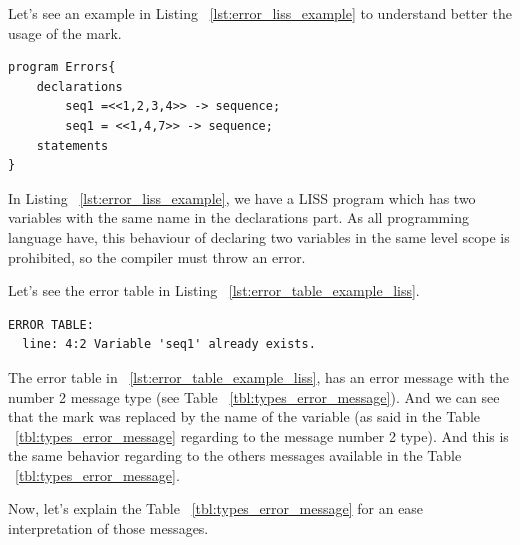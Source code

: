 \documentclass[
  oneside,
  11pt, a4paper,
  footinclude=true,
  headinclude=true,
  cleardoublepage=empty
]{scrbook}
\begin{document}
Let's see an example in Listing ~\ref{lst:error_liss_example} to understand better the usage of the mark.
\begin{lstlisting}[label={lst:error_liss_example},caption={Partial Listing}]
program Errors{
	declarations
		seq1 =<<1,2,3,4>> -> sequence;
		seq1 = <<1,4,7>> -> sequence;
	statements
}
\end{lstlisting}

In Listing ~\ref{lst:error_liss_example}, we have a LISS program which has two variables with the same name in the declarations part. As all programming language have, this behaviour of declaring two variables in the same level scope is prohibited, so the compiler must throw an error.

Let's see the error table in Listing ~\ref{lst:error_table_example_liss}.

\begin{lstlisting}[label={lst:error_table_example_liss},caption={Error table related to Listing ~\ref{lst:error_liss_example}}]
  ERROR TABLE:
  line: 4:2	Variable 'seq1' already exists.
\end{lstlisting}

The error table in ~\ref{lst:error_table_example_liss}, has an error message with the number 2 message type (see Table ~\ref{tbl:types_error_message}).
And we can see that the mark was replaced by the name of the variable (as said in the Table ~\ref{tbl:types_error_message} regarding to the message number 2 type).
And this is the same behavior regarding to the others messages available in the Table ~\ref{tbl:types_error_message}.

Now, let's explain the Table ~\ref{tbl:types_error_message} for an ease interpretation of those messages.
\end{document}

